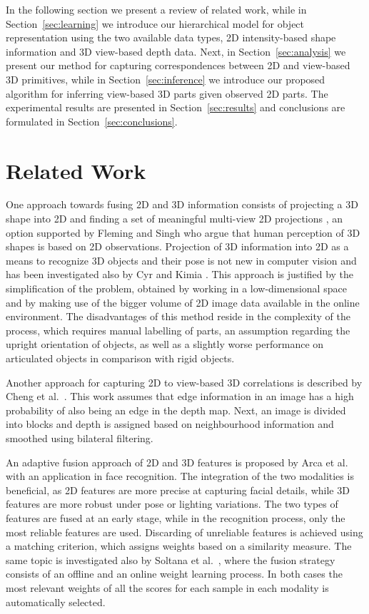 \documentclass[conference]{IEEEtran}
\begin{document}
In the following section we present a review of related work, while in Section~\ref{sec:learning} we introduce our hierarchical model for object representation using the two available data types, 2D intensity-based shape information and 3D view-based depth data. Next, in Section~\ref{sec:analysis} we present our method for capturing correspondences between 2D and view-based 3D primitives, while in Section~\ref{sec:inference} we introduce our proposed algorithm for inferring view-based 3D parts given observed 2D parts. The experimental results are presented in Section~\ref{sec:results} and conclusions are formulated in Section~\ref{sec:conclusions}.

\section{Related Work}
\label{sec:related_work}  

One approach towards fusing 2D and 3D information consists of projecting a 3D shape into 2D and finding a set of meaningful multi-view 2D projections \cite{WangGWC0C13}, an option supported by Fleming and Singh \cite{Fleming2009} who argue that human perception of 3D shapes is based on 2D observations. Projection of 3D information into 2D as a means to recognize 3D objects and their pose is not new in computer vision and has been investigated also by Cyr and Kimia \cite{Cyr2001}. This approach is justified by the simplification of the problem, obtained by working in a low-dimensional space and by making use of the bigger volume of 2D image data available in the online environment. The disadvantages of this method reside in the complexity of the process, which requires manual labelling of parts, an assumption regarding the upright orientation of objects, as well as a slightly worse performance on articulated objects in comparison with rigid objects.

Another approach for capturing 2D to view-based 3D correlations is described by Cheng et al.~\cite{Cheng2010}. This work assumes that edge information in an image has a high probability of also being an edge in the depth map. Next, an image is divided into blocks and depth is assigned based on neighbourhood information and smoothed using bilateral filtering.

An adaptive fusion approach of 2D and 3D features is proposed by Arca et al.~\cite{Arca2007} with an application in face recognition. The integration of the two modalities is beneficial, as 2D features are more precise at capturing facial details, while 3D features are more robust under pose or lighting variations. The two types of features are fused at an early stage, while in the recognition process, only the most reliable features are used. Discarding of unreliable features is achieved using a matching criterion, which assigns weights based on a similarity measure. The same topic is investigated also by Soltana et al.~\cite{Soltana2010}, where the fusion strategy consists of an offline and an online weight learning process. In both cases the most relevant weights of all the scores for each sample in each modality is automatically selected.
\end{document}
